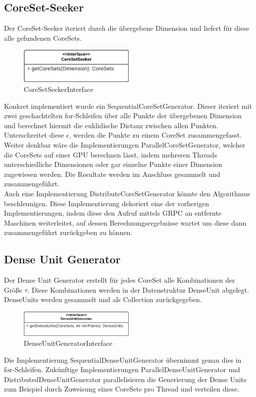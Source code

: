 \subsection{CoreSet-Seeker}
Der CoreSet-Seeker iteriert durch die übergebene Dimension und liefert für diese alle gefundenen CoreSets.
\begin{figure}[h]
	\centering
	\includegraphics[width=0.5\textwidth]{./Bilder/Restrukturierung/CoreSetSeeker.png}
	\caption{CoreSetSeekerInterface}
\end{figure}
Konkret implementiert wurde ein SequentialCoreSetGenerator. Dieser iteriert mit zwei geschachtelten for-Schleifen über alle Punkte der übergebenen Dimension und berechnet hiermit die euklidische Distanz zwischen allen Punkten. Unterschreitet diese $\epsilon$, werden die Punkte zu einem CoreSet zusammengefasst.\\
Weiter denkbar wäre die Implementierungen ParallelCoreSetGenerator, welcher die CoreSets auf einer GPU berechnen lässt, indem mehreren Threads unterschiedliche Dimensionen oder gar einzelne Punkte einer Dimension zugewiesen werden. Die Resultate werden im Anschluss gesammelt und zusammengeführt.\\
Auch eine Implementierung DistributeCoreSetGenerator könnte den Algorithmus beschleunigen. Diese Implementierung dekoriert eine der vorherigen Implementierungen, indem diese den Aufruf mittels GRPC an entfernte Maschinen weiterleitet, auf dessen Berechnungsergebnisse wartet um diese dann zusammengeführt zurückgeben zu können.

\subsection{Dense Unit Generator}
Der Dense Unit Generator erstellt für jedes CoreSet alle Kombinationen der Größe $\tau$. Diese Kombinationen werden in der Datenstruktur DenseUnit abgelegt. DenseUnits werden gesammelt und als Collection zurückgegeben.
\begin{figure}[h]
	\centering
	\includegraphics[width=0.5\textwidth]{./Bilder/Restrukturierung/DenseUnitGenerator.png}
	\caption{DenseUnitGeneratorInterface}
\end{figure}
Die Implementierung SequentialDenseUnitGenerator übernimmt genau dies in for-Schleifen. Zukünftige Implementierungen ParallelDenseUnitGenerator und DistributedDenseUnitGenerator parallelisieren die Generierung der Dense Units zum Beispiel durch Zuweisung eines CoreSets pro Thread und verteilen diese.

